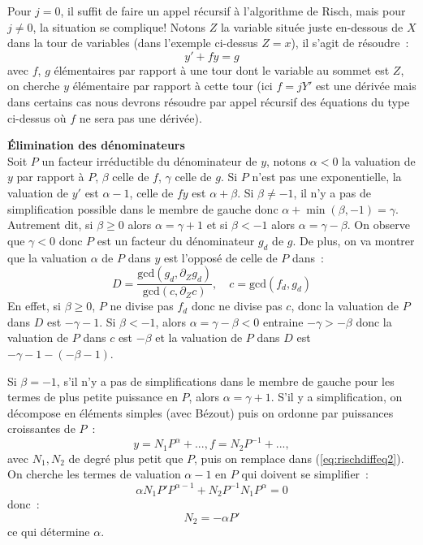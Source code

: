 \documentclass[a4paper,11pt]{article}
\begin{document}
\begin{giacjshere}
Pour $j=0$, il suffit de faire un appel récursif à l'algorithme de Risch,
mais pour $j\neq 0$, la situation se complique!
Notons $Z$ la variable situ\'ee juste en-dessous de $X$ dans la tour
de variables (dans l'exemple ci-dessus $Z=x$), il s'agit de r\'esoudre~: 
\begin{equation} \label{eq:rischdiffeq2}
y'+f y=g
\end{equation}
avec $f$, $g$ \'el\'ementaires par rapport \`a une tour dont le
variable au sommet est $Z$, on cherche $y$ \'el\'ementaire par rapport
\`a cette tour (ici $f=jY'$ est une d\'eriv\'ee mais dans certains
cas nous devrons r\'esoudre par appel r\'ecursif des \'equations
du type ci-dessus o\`u $f$ ne sera pas une d\'eriv\'ee).

{\bf \'Elimination des d\'enominateurs}\\
Soit $P$ un facteur irréductible du d\'enominateur de $y$, notons 
$\alpha<0$ la valuation de $y$ par rapport \`a $P$, 
$\beta$ celle de $f$, $\gamma$ celle de $g$. 
Si $P$ n'est pas une exponentielle,
la valuation de $y'$ est $\alpha-1$, celle de $ f y $ est $\alpha +\beta $. 
Si $\beta \neq -1$, 
il n'y a pas de simplification possible dans le membre de gauche
donc $\alpha + \min(\beta,-1) =\gamma$. Autrement dit, si 
$\beta \geq 0$ alors $\alpha=\gamma+1$ et si $\beta<-1$ 
alors $\alpha=\gamma-\beta$.
On observe que $\gamma<0$ donc
$P$ est un facteur du d\'enominateur $g_d$ de $g$. De plus, on va montrer
que la valuation $\alpha$ de $P$ dans $y$ est l'oppos\'e de celle
de $P$ dans~:
\begin{equation} \label{eq:defD}
D=\frac{\mbox{gcd}(g_d,\partial_Z g_d)}{\mbox{gcd}(c,\partial_Z c)}, 
\quad c=\mbox{gcd}(f_d,g_d)
\end{equation}
En effet, si $\beta \geq 0$, $P$ ne divise pas $f_d$ donc ne divise
pas $c$, donc la valuation de $P$ dans $D$ est $-\gamma-1$. Si $\beta < -1$,
alors $\alpha=\gamma - \beta <0$ entraine $-\gamma > -\beta$ donc la
valuation de $P$ dans $c$ est $-\beta$ et la valuation de $P$ dans $D$
est $-\gamma-1 - (-\beta-1)$.

Si $\beta=-1$, s'il n'y a pas de simplifications dans le membre
de gauche pour les termes de plus petite puissance en $P$, alors 
$\alpha=\gamma+1$. S'il y a simplification,
on d\'ecompose en \'el\'ements
simples (avec B\'ezout) puis on ordonne par puissances croissantes
de $P$~:
\[y= N_1 P^\alpha +..., f= N_2 P^{-1}+...,\]
avec $N_1,N_2$ de degré plus petit que $P$, puis on remplace dans 
(\ref{eq:rischdiffeq2}). On cherche les termes de valuation $\alpha-1$
en $P$ qui doivent se simplifier~:
\[ \alpha N_1 P' P^{\alpha-1} + N_2 P^{-1} N_1 P^\alpha =0 \]
donc~:
\[ N_2 = -\alpha P' \]
ce qui d\'etermine $\alpha$.


\end{giacjshere}
\end{document}
